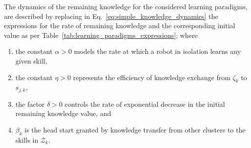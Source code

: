 \documentclass[12pt]{article}
\begin{document}
The dynamics of the remaining knowledge for the considered learning paradigms, are described by replacing in Eq.~\eqref{eq:simple_knowledge_dynamics} the expressions for the rate of remaining knowledge and the corresponding initial value as per Table~\ref{tab:learning_paradigms_expressions}; where
\begin{enumerate}
	\item the constant $ \alpha>0$ models the rate at which a robot in isolation learns any given skill,
	\item the constant $\eta>0$ represents the efficiency of knowledge exchange from $\zeta_k$ to $s_{j,k}$,
	\item the factor $\delta>0$ controls the rate of exponential decrease in the initial remaining knowledge value, and
	\item $\beta_k$ is the head start granted by knowledge transfer from other clusters to the skills in $\mathcal{Z}_k$.
\end{enumerate}
\end{document}

